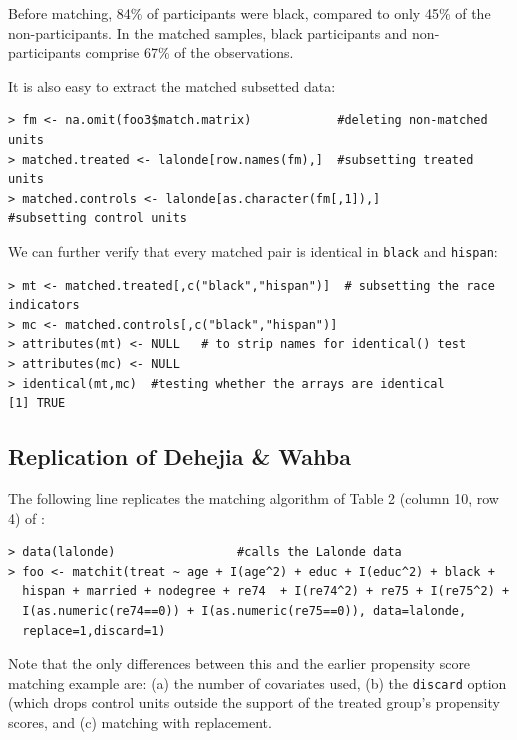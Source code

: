 \documentclass[oneside,letterpaper,titlepage]{article}
\begin{document}
Before matching, 84\% of participants were black, compared to only
45\% of the non-participants.  In the matched samples, black participants
and non-participants comprise 67\% of the observations. 

It is also easy to extract the matched subsetted data:

\begin{verbatim}
> fm <- na.omit(foo3$match.matrix)            #deleting non-matched units
> matched.treated <- lalonde[row.names(fm),]  #subsetting treated units
> matched.controls <- lalonde[as.character(fm[,1]),]        #subsetting control units
\end{verbatim}

We can further verify that every matched pair is identical
in \texttt{black} and \texttt{hispan}:

\begin{verbatim}
> mt <- matched.treated[,c("black","hispan")]  # subsetting the race indicators
> mc <- matched.controls[,c("black","hispan")]
> attributes(mt) <- NULL   # to strip names for identical() test
> attributes(mc) <- NULL
> identical(mt,mc)  #testing whether the arrays are identical
[1] TRUE
\end{verbatim}

\subsection{Replication of Dehejia \& Wahba}

The following line replicates the matching algorithm of Table 2
(column 10, row 4) of \citet{DehWah99}:

\begin{verbatim}
> data(lalonde)                 #calls the Lalonde data
> foo <- matchit(treat ~ age + I(age^2) + educ + I(educ^2) + black +
  hispan + married + nodegree + re74  + I(re74^2) + re75 + I(re75^2) +
  I(as.numeric(re74==0)) + I(as.numeric(re75==0)), data=lalonde,
  replace=1,discard=1)
\end{verbatim}

Note that the only differences between this and the earlier propensity
score matching example are: (a) the number of covariates used,  (b)
the \texttt{discard} option (which drops control units outside
the support of the treated group's propensity scores, and (c) matching with replacement. 
\end{document}
